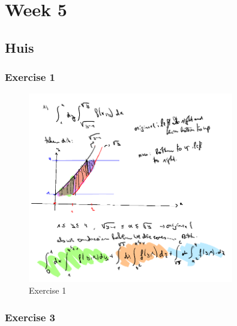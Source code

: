 \documentclass[a4paper]{report}
\begin{document}
\section{Week 5}

\subsection{Huis}

\subsubsection{Exercise 1}

\begin{figure}[H]
	\centering
	\includegraphics[width=0.8\textwidth]{assets/huis_5_ex_1.png}
	\caption{Exercise 1}
	\label{fig:huis_5_ex_1}
\end{figure}

\subsubsection{Exercise 3}
\end{document}
